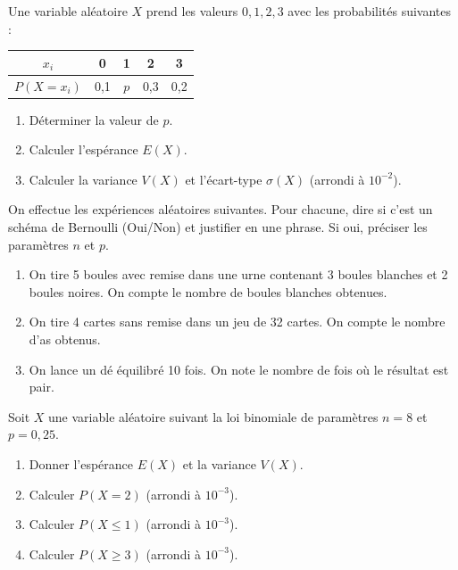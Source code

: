 \documentclass[11pt]{article}
\begin{document}
\begin{exercice}
Une variable aléatoire $X$ prend les valeurs $0, 1, 2, 3$ avec les probabilités suivantes :
\begin{center}
\begin{tabular}{|c|c|c|c|c|}
\hline
$x_i$ & 0 & 1 & 2 & 3 \\ \hline
$P(X=x_i)$ & 0,1 & $p$ & 0,3 & 0,2 \\ \hline
\end{tabular}
\end{center}
\begin{enumerate}
    \item Déterminer la valeur de $p$.
    \item Calculer l'espérance $E(X)$.
    \item Calculer la variance $V(X)$ et l'écart-type $\sigma(X)$ (arrondi à $10^{-2}$).
\end{enumerate}
\end{exercice}

\begin{exercice}
On effectue les expériences aléatoires suivantes. Pour chacune, dire si c'est un schéma de Bernoulli (Oui/Non) et justifier en une phrase. Si oui, préciser les paramètres $n$ et $p$.
\begin{enumerate}
    \item On tire 5 boules avec remise dans une urne contenant 3 boules blanches et 2 boules noires. On compte le nombre de boules blanches obtenues.
    \item On tire 4 cartes sans remise dans un jeu de 32 cartes. On compte le nombre d'as obtenus.
    \item On lance un dé équilibré 10 fois. On note le nombre de fois où le résultat est pair.
\end{enumerate}
\end{exercice}

\begin{exercice}
Soit $X$ une variable aléatoire suivant la loi binomiale de paramètres $n=8$ et $p=0,25$.
\begin{enumerate}
    \item Donner l'espérance $E(X)$ et la variance $V(X)$.
    \item Calculer $P(X=2)$ (arrondi à $10^{-3}$).
    \item Calculer $P(X \le 1)$ (arrondi à $10^{-3}$).
    \item Calculer $P(X \ge 3)$ (arrondi à $10^{-3}$).
\end{enumerate}
\end{exercice}
\end{document}
